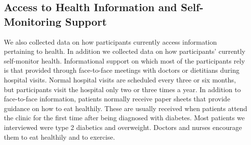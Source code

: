 \subsection{Access to Health Information and Self-Monitoring Support}
We also collected data on how participants currently access information pertaining to health. In addition we collected data on how participants' currently self-monitor health. Informational support on which most of the participants rely is that provided through face-to-face meetings with doctors or dietitians during hospital visits. Normal hospital visits are scheduled every three or six months, but participants visit the hospital only two or three times a year. In addition to face-to-face information, patients normally receive paper sheets that provide guidance on how to eat healthily. These are usually received when patients attend the clinic for the first time after being diagnosed with diabetes. Most patients we interviewed were type 2 diabetics and overweight. Doctors and nurses encourage them to eat healthily and to exercise. 

